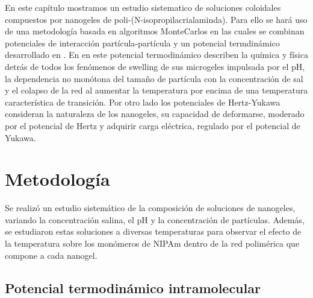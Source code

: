 	
	En este cap\'itulo mostramos un estudio sistematico de soluciones coloidales compuestos por nanogeles de poli-(N-isopropilacrialaminda). Para ello se har\'a uso de una metodolog\'ia basada en algoritmos MonteCarlos en las cuales se combinan potenciales de interacci\'on part\'icula-part\'icula  y un potencial termdin\'amico desarrollado en \cite{perez2021thermodynamic}. En en este potencial termodin\'amico \citet{perez2021thermodynamic} describen la qu\'imica y f\'isica detr\'as de todos los fen\'omenos de swelling de sus microgeles impulsada por el pH, la dependencia no mon\'otona del tama\~no de part\'icula con la concentraci\'on de sal y el colapso de la red al aumentar la temperatura por encima de una temperatura caracter\'istica de transici\'on.
	Por otro lado los potenciales de Hertz-Yukawa consideran la naturaleza de los nanogeles, su capacidad de deformarse, moderado por el potencial de Hertz y adquirir carga el\'ectrica, regulado por el potencial de Yukawa.
	
	
	
	\section{Metodolog\'ia}
	
	Se realiz\'o un estudio sistem\'atico de la composici\'on de soluciones de nanogeles, variando la concentraci\'on salina, el pH y la concentraci\'on de part\'iculas. Adem\'as, se estudiaron estas soluciones a diversas temperaturas para observar el efecto de la temperatura sobre los mon\'omeros de NIPAm dentro de la red polim\'erica que compone a cada nanogel.
	
	\subsection{Potencial termodin\'amico intramolecular}
	
